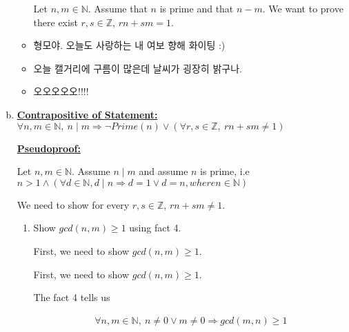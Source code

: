 \documentclass[12pt]{article}
\begin{document}
\begin{enumerate}[a.]
\begin{itemize}
        \begin{mdframed}
            Let $n, m \in \mathbb{N}$. Assume that $n$ is prime and that $n - m$.
            We want to prove there exist $r, s \in \mathbb{Z}$, $rn + sm = 1$.

        \end{mdframed}
        \item 형모야. 오늘도 사랑하는 내 여보 향해 화이팅 :)
        \item 오늘 캘거리에 구름이 많은데 날씨가 굉장히 밝구나.
        \item 오오오오오!!!!
    \end{itemize}

    \item

    \underline{\textbf{Contrapositive of Statement:}} $\forall n,m \in \mathbb{N},\:
    n \mid m \Rightarrow \neg Prime(n) \lor (\forall r,s \in \mathbb{Z},\:rn + sm \neq 1)$

    \bigskip

    \begin{mdframed}
        \underline{\textbf{Pseudoproof:}}

        \bigskip

        Let $n,m \in \mathbb{N}$. Assume $n \mid m$ and assume $n$ is prime, i.e
        $n > 1 \land (\forall d \in \mathbb{N}, d \mid n \Rightarrow d = 1 \lor d = n, where n \in \mathbb{N})$

        \bigskip

        We need to show for every $r,s \in \mathbb{Z}$, $rn + sm \neq 1$.

        \bigskip

        \begin{enumerate}[1.]
            \item Show $gcd(n,m) \geq 1$ using fact 4.

            First, we need to show $gcd(n,m) \geq 1$.

            \begin{mdframed}
            First, we need to show $gcd(n,m) \geq 1$.

            \bigskip

            The fact 4 tells us

            \begin{align}
                \forall n,m \in \mathbb{N},\: n \neq 0 \lor m \neq 0 \Rightarrow gcd(m,n) \geq 1
            \end{align}


\end{mdframed}
\end{enumerate}
\end{mdframed}
\end{enumerate}
\end{document}
